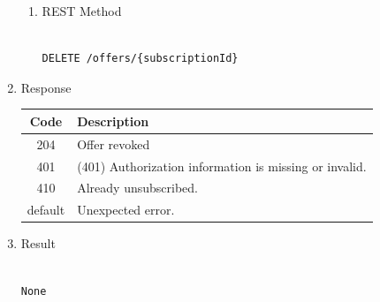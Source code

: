 \begin{enumerate}
\begin{enumerate}
\item REST Method

\begin{tcolorbox}[boxrule=0pt, frame empty]
\begin{verbatim} 

DELETE /offers/{subscriptionId}

\end{verbatim}
\end{tcolorbox}

\end{enumerate}

\item Response

\begin{center}
\begin{tabular}{|c|l|} 
\hline
\rowcolor{lightgray}	Code 		& 	Description \\
\hline
204	 		&	Offer revoked \\
\hline
401			&	(401) Authorization information is missing or invalid. \\
\hline
410			&	Already unsubscribed. \\
\hline
default		&	Unexpected error. \\
\hline
\end{tabular}
\end{center}

\item Result

\begin{tcolorbox}[boxrule=0pt, frame empty]
\begin{verbatim}

None

\end{verbatim}
\end{tcolorbox}







\end{enumerate}
